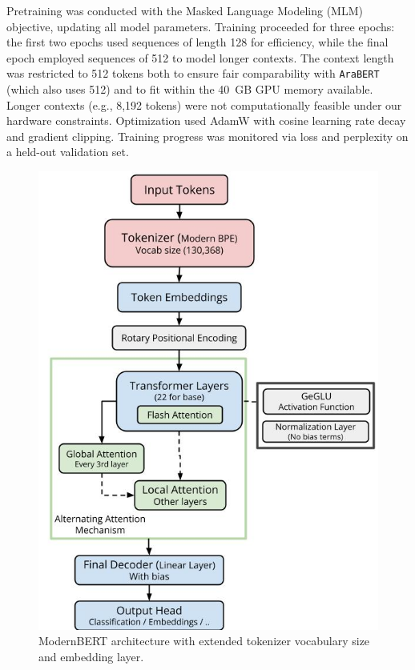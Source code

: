 \documentclass[10pt, a4paper]{article}
\begin{document}
Pretraining was conducted with the Masked Language Modeling (MLM) objective, updating all model parameters. Training proceeded for three epochs: the first two epochs used sequences of length 128 for efficiency, while the final epoch employed sequences of 512 to model longer contexts. The context length was restricted to 512 tokens both to ensure fair comparability with \texttt{AraBERT} (which also uses 512) and to fit within the 40~GB GPU memory available. Longer contexts (e.g., 8,192 tokens) were not computationally feasible under our hardware constraints. 
Optimization used AdamW with cosine learning rate decay and gradient clipping. Training progress was monitored via loss and perplexity on a held-out validation set.  

\begin{figure}[!ht]
\begin{center}
\includegraphics[width=\columnwidth]{LREC2026 Author's kit/ModernArabert (1).jpg}
\caption{ModernBERT architecture with extended tokenizer vocabulary size and embedding layer.}
\label{fig:model}
\end{center}
\end{figure}
\end{document}
